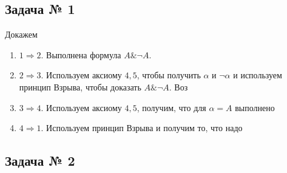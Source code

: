 
\subsection{Задача № 1}
Докажем
\begin{enumerate}
    \item $1 \Rightarrow 2$. Выполнена формула $A \& \neg A$.
    \item $2 \Rightarrow 3$. Используем аксиому $4,5$, чтобы получить $\alpha$ и $\neg \alpha$ и используем принцип Взрыва, чтобы доказать $A \&\neg A$. Воз
    \item $3 \Rightarrow 4$. Используем аксиому $4,5$, получим, что для $\alpha = A$ выполнено
    \item $4 \Rightarrow 1$. Используем принцип Взрыва и получим то, что надо
\end{enumerate}

\subsection{Задача № 2}

